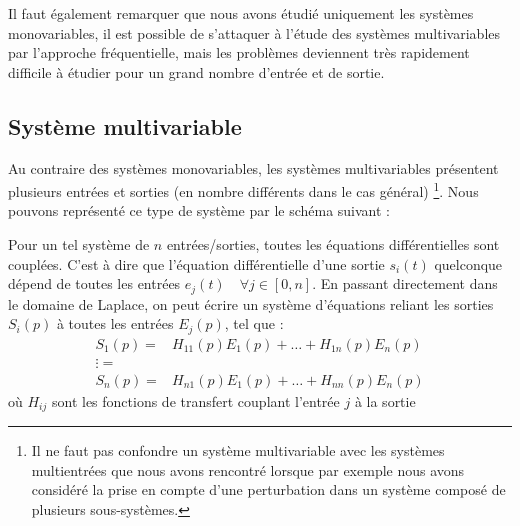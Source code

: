 Il faut également remarquer que nous avons étudié uniquement les systèmes
monovariables, il est possible de s'attaquer à l'étude des systèmes 
multivariables par l'approche fréquentielle, mais les problèmes deviennent
très rapidement difficile à étudier pour un grand nombre d'entrée et de sortie.   
\subsection{Système multivariable}
Au contraire des systèmes monovariables, les systèmes multivariables présentent
plusieurs entrées et sorties (en nombre différents dans le cas général)
\footnote{Il ne faut pas confondre un système
multivariable avec les systèmes multientrées que nous avons rencontré lorsque
par exemple nous avons considéré la prise en compte d'une perturbation dans
un système composé de plusieurs sous-systèmes.}. Nous pouvons représenté ce 
type de système par le schéma suivant :
\begin{center}
    
\end{center}
Pour un tel système de $n$ entrées/sorties, 
toutes les équations différentielles sont couplées. 
C'est à dire que l'équation différentielle d'une sortie $s_i(t)$ quelconque 
dépend de toutes les entrées $e_j(t)\quad\forall j\in[0,n]$. En passant 
directement dans le domaine de 
Laplace, on peut écrire un système d'équations reliant les sorties $S_i(p)$ 
à toutes les entrées $E_j(p)$, tel que  :
\begin{align*}
    S_1(p) =& H_{11}(p) E_1(p) + \ldots + H_{1n}(p) E_n(p) \\
    \vdots =& \\ 
    S_n(p) =& H_{n1}(p) E_1(p) + \ldots + H_{nn}(p) E_n(p)
\end{align*}
où $H_{ij}$ sont les fonctions de transfert couplant l'entrée $j$ à la sortie 
